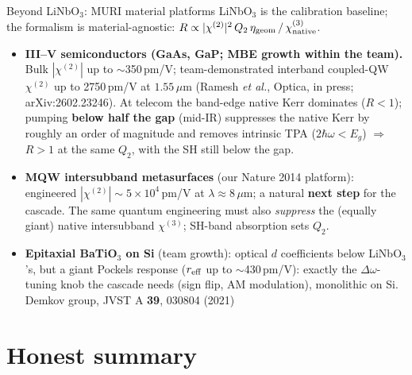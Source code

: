 \documentclass[aspectratio=169,10pt]{beamer}
\newcommand{\chitwo}{\chi^{(2)}}
\newcommand{\chithree}{\chi^{(3)}}
\newcommand{\Dom}{\Delta\omega}
\begin{document}
\begin{frame}{Beyond LiNbO$_3$: MURI material platforms}
  \small
  LiNbO$_3$ is the calibration baseline; the formalism is material-agnostic:
  $R \propto |\chitwo|^2\, Q_2\, \eta_{\rm geom}\, /\, \chi^{(3)}_{\rm native}$.
  \vspace{2pt}
  \begin{itemize}\setlength\itemsep{6pt}
    \item \textbf{III--V semiconductors (GaAs, GaP; MBE growth within the team).}
          Bulk $|\chitwo|$ up to $\sim$350\,pm/V; team-demonstrated interband
          coupled-QW $\chitwo$ up to 2750\,pm/V at $1.55\,\mu$m
          {\tiny\color{gray}(Ramesh \emph{et al.}, Optica, in press; arXiv:2602.23246)}.
          At telecom the band-edge native Kerr dominates ($R<1$);
          pumping \textbf{below half the gap} (mid-IR) suppresses the native Kerr by
          roughly an order of magnitude and removes intrinsic TPA
          ($2\hbar\omega < E_g$) $\Rightarrow$ $R>1$ at the same $Q_2$, with the SH
          still below the gap.
    \item \textbf{MQW intersubband metasurfaces} (our Nature 2014 platform):
          engineered $|\chitwo| \sim 5\times10^{4}$\,pm/V at $\lambda\approx8\,\mu$m;
          a natural \textbf{next step} for the cascade. The same quantum engineering
          must also \emph{suppress} the (equally giant) native intersubband
          $\chithree$; SH-band absorption sets $Q_2$.
    \item \textbf{Epitaxial BaTiO$_3$ on Si} (team growth): optical $d$ coefficients
          below LiNbO$_3$'s, but a giant Pockels response
          ($r_{\rm eff}$ up to $\sim$430\,pm/V): exactly the $\Dom$-tuning knob the
          cascade needs (sign flip, AM modulation), monolithic on Si.
          \hfill {\tiny\color{gray} Demkov group, JVST A \textbf{39}, 030804 (2021)}
  \end{itemize}
\end{frame}

\section{Honest summary}
\end{document}
